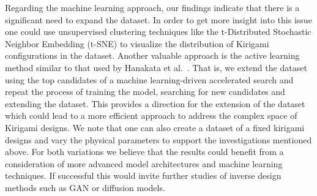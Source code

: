 Regarding the machine learning approach, our findings indicate that there is a
significant need to expand the dataset. In order to get more insight into this
issue one could use unsupervised clustering techniques like the t-Distributed
Stochastic Neighbor Embedding (t-SNE) to visualize the distribution of Kirigami
configurations in the dataset. Another valuable approach is the active learning
method similar to that used by Hanakata et al.~\cite{PhysRevLett.121.255304}.
That is, we extend the dataset using the top candidates of a machine
learning-driven accelerated search and repeat the process of training the model,
searching for new candidates and extending the dataset. This provides a
direction for the extension of the dataset which could lead to a more efficient
approach to address the complex space of Kirigami designs. We note that one can also create a dataset of a fixed kirigami designs and vary the physical parameters to support the investigations mentioned above. For both variations we believe that the results could benefit from a consideration of more advanced model architectures and machine learning techniques. If successful this would invite further studies of inverse design methods such as \acrshort{GAN} or diffusion models. 






